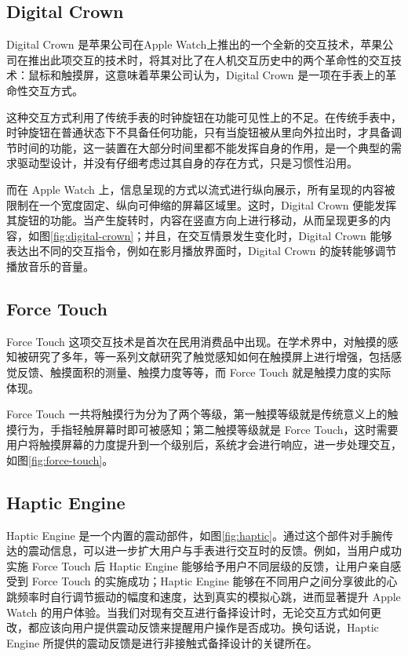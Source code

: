 \subsection{Digital Crown}

Digital Crown 是苹果公司在Apple Watch上推出的一个全新的交互技术，苹果公司在推出此项交互的技术时，将其对比了在人机交互历史中的两个革命性的交互技术：鼠标和触摸屏，这意味着苹果公司认为，Digital Crown 是一项在手表上的革命性交互方式。

这种交互方式利用了传统手表的时钟旋钮在功能可见性上的不足。在传统手表中，时钟旋钮在普通状态下不具备任何功能，只有当旋钮被从里向外拉出时，才具备调节时间的功能，这一装置在大部分时间里都不能发挥自身的作用，是一个典型的需求驱动型设计，并没有仔细考虑过其自身的存在方式，只是习惯性沿用。

而在 Apple Watch 上，信息呈现的方式以流式进行纵向展示，所有呈现的内容被限制在一个宽度固定、纵向可伸缩的屏幕区域里。这时，Digital Crown 便能发挥其旋钮的功能。当产生旋转时，内容在竖直方向上进行移动，从而呈现更多的内容，如图\ref{fig:digital-crown}；并且，在交互情景发生变化时，Digital Crown 能够表达出不同的交互指令，例如在影月播放界面时，Digital Crown 的旋转能够调节播放音乐的音量。

\subsection{Force Touch}

Force Touch 这项交互技术是首次在民用消费品中出现。在学术界中，对触摸的感知被研究了多年，\cite{Boring:2012ea}等一系列文献研究了触觉感知如何在触摸屏上进行增强，包括感觉反馈、触摸面积的测量、触摸力度等等，而 Force Touch 就是触摸力度的实际体现。

Force Touch 一共将触摸行为分为了两个等级，第一触摸等级就是传统意义上的触摸行为，手指轻触屏幕时即可被感知；第二触摸等级就是 Force Touch，这时需要用户将触摸屏幕的力度提升到一个级别后，系统才会进行响应，进一步处理交互，如图\ref{fig:force-touch}。

\subsection{Haptic Engine}

Haptic Engine 是一个内置的震动部件，如图\ref{fig:haptic}。通过这个部件对手腕传达的震动信息，可以进一步扩大用户与手表进行交互时的反馈。例如，当用户成功实施 Force Touch 后 Haptic Engine 能够给予用户不同层级的反馈，让用户亲自感受到 Force Touch 的实施成功；Haptic Engine 能够在不同用户之间分享彼此的心跳频率时自行调节振动的幅度和速度，达到真实的模拟心跳，进而显著提升 Apple Watch 的用户体验。当我们对现有交互进行备择设计时，无论交互方式如何更改，都应该向用户提供震动反馈来提醒用户操作是否成功。换句话说，Haptic Engine 所提供的震动反馈是进行非接触式备择设计的关键所在。


